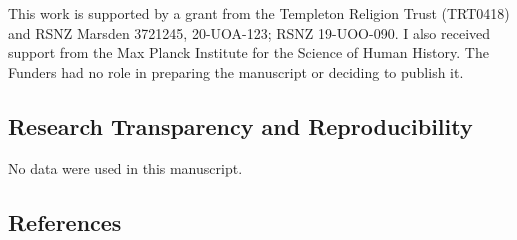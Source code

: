 \documentclass[
  single column]{article}
\begin{document}
This work is supported by a grant from the Templeton Religion Trust
(TRT0418) and RSNZ Marsden 3721245, 20-UOA-123; RSNZ 19-UOO-090. I also
received support from the Max Planck Institute for the Science of Human
History. The Funders had no role in preparing the manuscript or deciding
to publish it.

\subsection{Research Transparency and
Reproducibility}\label{research-transparency-and-reproducibility}

No data were used in this manuscript.

\newpage{}

\subsection{References}\label{references}
\end{document}
